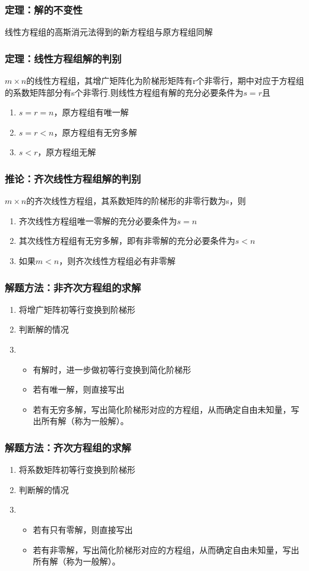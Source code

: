 \documentclass[UTF-8,a4paper]{ctexart}
\begin{document}
\subsubsection{定理：解的不变性} 线性方程组的高斯消元法得到的新方程组与原方程组同解
\subsubsection{定理：线性方程组解的判别} \(m \times n\)的线性方程组，其增广矩阵化为阶梯形矩阵有r个非零行，期中对应于方程组的系数矩阵部分有s个非零行.则线性方程组有解的充分必要条件为\(s=r\)且
\begin{enumerate}
    \item \(s=r=n\)，原方程组有唯一解
    \item \(s=r<n\)，原方程组有无穷多解
    \item \(s<r\)，原方程组无解
\end{enumerate}
\subsubsection{推论：齐次线性方程组解的判别} \(m \times n\)的齐次线性方程组，其系数矩阵的阶梯形的非零行数为s，则
\begin{enumerate}
    \item 齐次线性方程组唯一零解的充分必要条件为\(s=n\)
    \item 其次线性方程组有无穷多解，即有非零解的充分必要条件为\(s<n\)
    \item 如果\(m<n\)，则齐次线性方程组必有非零解
\end{enumerate}
\subsubsection{解题方法：非齐次方程组的求解}
\begin{enumerate}
    \item 将增广矩阵初等行变换到阶梯形
    \item 判断解的情况
    \item {\begin{itemize}
        \item 有解时，进一步做初等行变换到简化阶梯形
        \item 若有唯一解，则直接写出
        \item 若有无穷多解，写出简化阶梯形对应的方程组，从而确定自由未知量，写出所有解（称为一般解）。
        \end{itemize}}
\end{enumerate}

\subsubsection{解题方法：齐次方程组的求解}
\begin{enumerate}
    \item 将系数矩阵初等行变换到阶梯形
    \item 判断解的情况
    \item {\begin{itemize}
        \item 若有只有零解，则直接写出
        \item 若有非零解，写出简化阶梯形对应的方程组，从而确定自由未知量，写出所有解（称为一般解）。
        \end{itemize}}
\end{enumerate}
\end{document}

